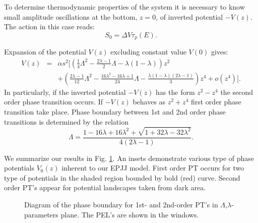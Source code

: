 \documentclass[aps, pre, preprint, groupedaddress, superscriptaddress, showkeys, showpacs] {revtex4-1}
\begin{document}
To determine thermodynamic properties of the system it is necessary to know small amplitude oscillations  at the bottom, $z=0$, of inverted potential $-V(z)$.
The action in this case reads: 
%
\begin{equation}
S_0 = \Delta V \tau_p (E).
\label{eq:thermal_action}
\end{equation}
%

Expansion of the potential $V(z)$ excluding constant value $V(0)$ gives:
%
\begin{equation}
\begin{array}{lcl}
V(z) & = & \alpha s^2 \Big[ \left( \frac{1}{4} \Lambda^2  - \frac{2\lambda - 1}{2} \Lambda - \lambda (1 - \lambda) \right) z^2 \\
&& + \left( \frac{2\lambda - 1}{12} \Lambda^2 - \frac{16\lambda^2 - 16\lambda + 1}{24} \Lambda - \frac{\lambda (1 - \lambda) (2\lambda - 1)}{3} \right) z^4 + o(z^4) \Big].
\end{array}
\label{eq:potential_teylor}
\end{equation}
%
In particularly, if the inverted potential $-V(z)$ has the form $z^2 - z^4$ the second order phase transition occurs.
If $-V(z)$ behaves as $z^2 + z^4$ first order phase transition take place.
Phase boundary between 1st and 2nd order phase transitions is determined by the relation
%
\begin{equation}
\Lambda = \frac{1 - 16\lambda + 16\lambda^2 + \sqrt{1 + 32\lambda - 32\lambda^2}}{4(2\lambda - 1)}.
\label{eq:order_border}
\end{equation}
%

We summarize our results in Fig. \ref{pic:phase_boundary_combined}. An insets demonstrate various type of  phase potentials $V_0(z)$ inherent to our EPJJ model. First order PT occurs for two type of potentials in the shaded region bounded by bold  (red) curve.  Second order PT's appear for potential landscapes taken from  dark area. 
%
\begin{figure}[ht]
\caption{Diagram of the phase boundary for  1st- and 2nd-order  PT's in $\Lambda$,$\lambda$-parameters plane. The PEL's are shown in the windows. \label{pic:phase_boundary_combined}}
\end{figure}
%
\end{document}
